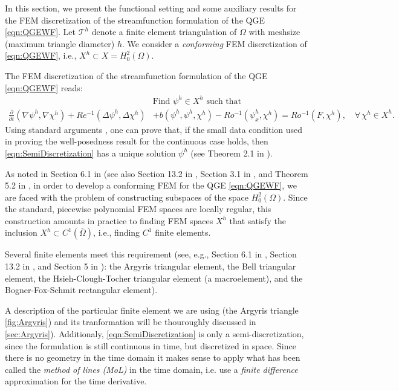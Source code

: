 In this section, we present the functional setting and some auxiliary results
for the FEM discretization of the streamfunction formulation of the QGE
\eqref{eqn:QGEWF}. Let $\mathcal{T}^h$ denote a finite element triangulation of
$\Omega$ with meshsize (maximum triangle diameter) $h$. We consider a
\emph{conforming} FEM discretization of \eqref{eqn:QGEWF}, i.e., $X^h \subset X
= H_0^2(\Omega)$.

The FEM discretization of the streamfunction formulation of the QGE
\eqref{eqn:QGEWF} reads:
\begin{equation}
  \begin{split}
    &\text{Find } \psi^h \in X^h \text{ such that} \\
    \frac{\partial}{\partial t} (\nabla \psi^h, \nabla \chi^h)
      + Re^{-1} (\Delta \psi^h, \Delta \chi^h)
      &+ b(\psi^h,\psi^h,\chi^h)
      - Ro^{-1} (\psi_x^h,\chi^h)
      = Ro^{-1}(F,\chi^h),\quad \forall \, \chi^h \in X^h.
    \label{eqn:SemiDiscretization}
  \end{split}
\end{equation}
Using standard arguments \cite{Girault79,Girault86}, one can prove that, if the
small data condition used in proving the well-posedness result for the
continuous case holds, then \eqref{eqn:SemiDiscretization} has a unique solution
$\psi^h$ (see Theorem 2.1 in \cite{Cayco86}).

As noted in Section 6.1 in \cite{Ciarlet} (see also Section 13.2 in
\cite{Gunzburger89}, Section 3.1 in \cite{Johnson}, and Theorem 5.2 in
\cite{Braess}, in order to develop a conforming FEM for the QGE
\eqref{eqn:QGEWF}, we are faced with the problem of constructing subspaces of
the space $H^2_0(\Omega)$. Since the standard, piecewise polynomial FEM spaces
are locally regular, this construction amounts in practice to finding FEM spaces
$X^h$ that satisfy the inclusion $X^h \subset C^1({\bar \Omega})$, i.e., finding
$C^1$ finite elements.

Several finite elements meet this requirement (see, e.g., Section 6.1 in
\cite{Ciarlet}, Section 13.2 in \cite{Gunzburger89}, and Section 5 in
\cite{Braess}): the Argyris triangular element, the Bell triangular element, the
Hsieh-Clough-Tocher triangular element (a macroelement), and the
Bogner-Fox-Schmit rectangular element).

A description of the particular finite element we are using (the Argyris
triangle \autoref{fig:Argyris}) and its tranformation will be thouroughly
discussed in \autoref{sec:Argyris}). Additionaly, \eqref{eqn:SemiDiscretization}
is only a semi-discretization, since the formulation is still continuous in
time, but discretized in space. Since there is no geometry in the time domain it
makes sense to apply what has been called the \emph{method of lines (MoL)} in
the time domain, i.e. use a \emph{finite difference} approximation for the time
derivative. %

